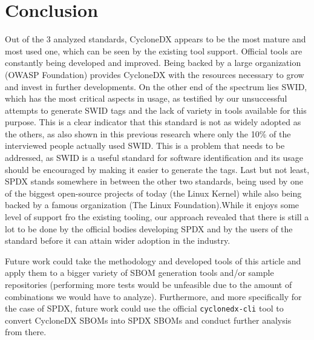 \section{Conclusion}

Out of the 3 analyzed standards, CycloneDX appears to be the most mature and most used one, which can be seen by the existing tool support. Official tools are constantly being developed and improved. Being backed by a large organization (OWASP Foundation) provides CycloneDX with the resources necessary to grow and invest in further developments. On the other end of the spectrum lies SWID, which has the most critical aspects in usage, as testified by our unsuccessful attempts to generate SWID tags and the lack of variety in tools available for this purpose. This is a clear indicator that this standard is not as widely adopted as the others, as also shown in this previous research \cite{article:software-bom} where only the 10\% of the interviewed people actually used SWID.  This is a problem that needs to be addressed, as SWID is a useful standard for software identification and its usage should be encouraged by making it easier to generate the tags. Last but not least, SPDX stands somewhere in between the other two standards, being used by one of the biggest open-source projects of today (the Linux Kernel) while also being backed by a famous organization (The Linux Foundation).While it enjoys some level of support fro the existing tooling, our approach revealed that there is still a lot to be done by the official bodies developing SPDX and by the users of the standard before it can attain wider adoption in the industry.

Future work could take the methodology and developed tools of this article and apply them to a bigger variety of SBOM generation tools and/or sample repositories (performing more tests would be unfeasible due to the amount of combinations we would have to analyze). Furthermore, and more specifically for the case of SPDX, future work could use the official \verb|cyclonedx-cli| tool to convert CycloneDX SBOMs into SPDX SBOMs and conduct further analysis from there.